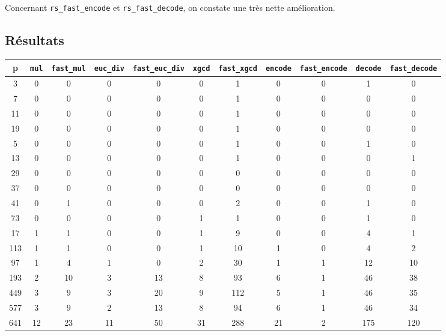 \documentclass{article}
\theoremstyle{definition}
\theoremstyle{remark}
\begin{document}
Concernant \verb|rs_fast_encode| et \verb|rs_fast_decode|, on constate une très nette amélioration.


\newpage

\begin{landscape}

\appendix

\section*{Résultats}

\begin{table}[!ht]
    \centering
    \begin{tabular}{c|c|c|c|c|c|c|c|c|c|c}
        \textbf{p} & \verb|mul| & \verb|fast_mul| & \verb|euc_div| & \verb|fast_euc_div| & \verb|xgcd| & \verb|fast_xgcd| & \verb|encode| & \verb|fast_encode| & \verb|decode| & \verb|fast_decode| \\ \hline
        3 & 0 & 0 & 0 & 0 & 0 & 1 & 0 & 0 & 1 & 0 \\ 
        7 & 0 & 0 & 0 & 0 & 0 & 1 & 0 & 0 & 0 & 0 \\ 
        11 & 0 & 0 & 0 & 0 & 0 & 1 & 0 & 0 & 0 & 0 \\ 
        19 & 0 & 0 & 0 & 0 & 0 & 1 & 0 & 0 & 0 & 0 \\ 
        5 & 0 & 0 & 0 & 0 & 0 & 1 & 0 & 0 & 1 & 0 \\ 
        13 & 0 & 0 & 0 & 0 & 0 & 1 & 0 & 0 & 0 & 1 \\ 
        29 & 0 & 0 & 0 & 0 & 0 & 0 & 0 & 0 & 0 & 0 \\ 
        37 & 0 & 0 & 0 & 0 & 0 & 0 & 0 & 0 & 0 & 0 \\ 
        41 & 0 & 1 & 0 & 0 & 0 & 2 & 0 & 0 & 1 & 0 \\ 
        73 & 0 & 0 & 0 & 0 & 1 & 1 & 0 & 0 & 1 & 0 \\ 
        17 & 1 & 1 & 0 & 0 & 1 & 9 & 0 & 0 & 4 & 1 \\ 
        113 & 1 & 1 & 0 & 0 & 1 & 10 & 1 & 0 & 4 & 2 \\ 
        97 & 1 & 4 & 1 & 0 & 2 & 30 & 1 & 1 & 12 & 10 \\ 
        193 & 2 & 10 & 3 & 13 & 8 & 93 & 6 & 1 & 46 & 38 \\ 
        449 & 3 & 9 & 3 & 20 & 9 & 112 & 5 & 1 & 46 & 35 \\ 
        577 & 3 & 9 & 2 & 13 & 8 & 94 & 6 & 1 & 46 & 34 \\ 
        641 & 12 & 23 & 11 & 50 & 31 & 288 & 21 & 2 & 175 & 120 \\ 

\end{tabular}
\end{table}
\end{landscape}
\end{document}
